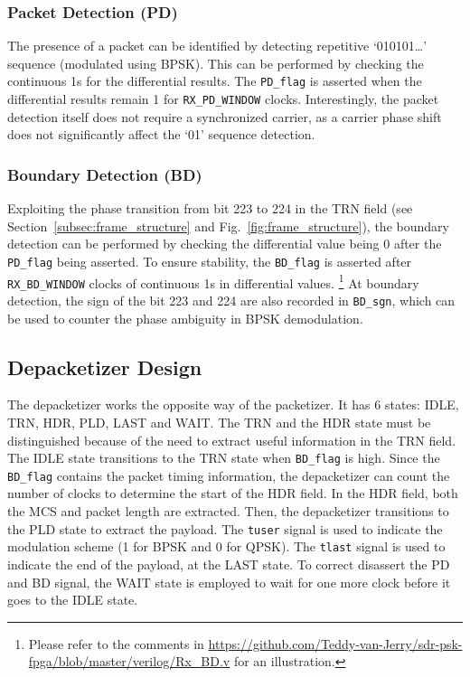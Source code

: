 \documentclass[journal,twoside]{IEEEtran}
\begin{document}
      \subsubsection{Packet Detection (PD)}
      The presence of a packet can be identified by detecting repetitive `010101\dots' sequence (modulated using BPSK).
      This can be performed by checking the continuous 1s for the differential results.
      The \texttt{PD\_flag} is asserted when the differential results remain 1 for \texttt{RX\_PD\_WINDOW} clocks.
      Interestingly, the packet detection itself does not require a synchronized carrier,
      as a carrier phase shift does not significantly affect the `01' sequence detection.

      \subsubsection{Boundary Detection (BD)}
      Exploiting the phase transition from bit 223 to 224 in the TRN field
      (see Section~\ref{subsec:frame_structure} and Fig.~\ref{fig:frame_structure}),
      the boundary detection can be performed by checking the differential value being 0
      after the \texttt{PD\_flag} being asserted.
      To ensure stability,
      the \texttt{BD\_flag} is asserted after \texttt{RX\_BD\_WINDOW} clocks of continuous 1s in differential values.%
      \footnote{Please refer to the comments in \url{https://github.com/Teddy-van-Jerry/sdr-psk-fpga/blob/master/verilog/Rx_BD.v}
        for an illustration.}
      At boundary detection,
      the sign of the bit 223 and 224 are also recorded in \texttt{BD\_sgn},
      which can be used to counter the phase ambiguity in BPSK demodulation.%

    \subsection{Depacketizer Design}

      The depacketizer works the opposite way of the packetizer.
      It has 6 states: IDLE, TRN, HDR, PLD, LAST and WAIT.
      The TRN and the HDR state must be distinguished because of the need
      to extract useful information in the TRN field.
      The IDLE state transitions to the TRN state when \texttt{BD\_flag} is high.
      Since the \texttt{BD\_flag} contains the packet timing information,
      the depacketizer can count the number of clocks to determine the start of the HDR field.
      In the HDR field, both the MCS and packet length are extracted.
      Then, the depacketizer transitions to the PLD state to extract the payload.
      The \texttt{tuser} signal is used to indicate the modulation scheme (1 for BPSK and 0 for QPSK).
      The \texttt{tlast} signal is used to indicate the end of the payload, at the LAST state.
      To correct disassert the PD and BD signal,
      the WAIT state is employed to wait for one more clock
      before it goes to the IDLE state.
\end{document}
